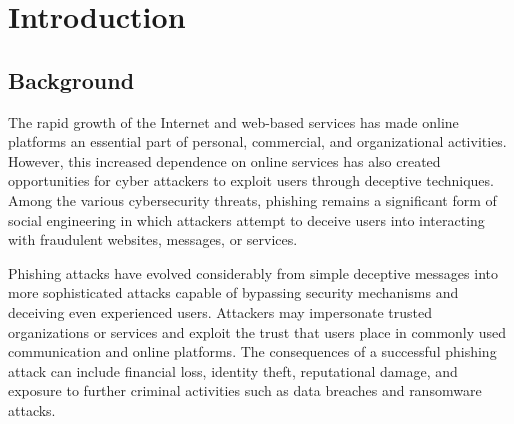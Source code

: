 \documentclass[12pt,a4paper]{report}
\begin{document}
\clearpage



\tableofcontents

\clearpage


\listoffigures

\clearpage


\listoftables

\clearpage




\chapter{Introduction}

\section{Background}

The rapid growth of the Internet and web-based services has made
online platforms an essential part of personal, commercial, and
organizational activities. However, this increased dependence on
online services has also created opportunities for cyber attackers
to exploit users through deceptive techniques. Among the various
cybersecurity threats, phishing remains a significant form of
social engineering in which attackers attempt to deceive users into
interacting with fraudulent websites, messages, or services.

Phishing attacks have evolved considerably from simple deceptive
messages into more sophisticated attacks capable of bypassing
security mechanisms and deceiving even experienced users. Attackers
may impersonate trusted organizations or services and exploit the
trust that users place in commonly used communication and online
platforms. The consequences of a successful phishing attack can
include financial loss, identity theft, reputational damage, and
exposure to further criminal activities such as data breaches and
ransomware attacks.
\end{document}
